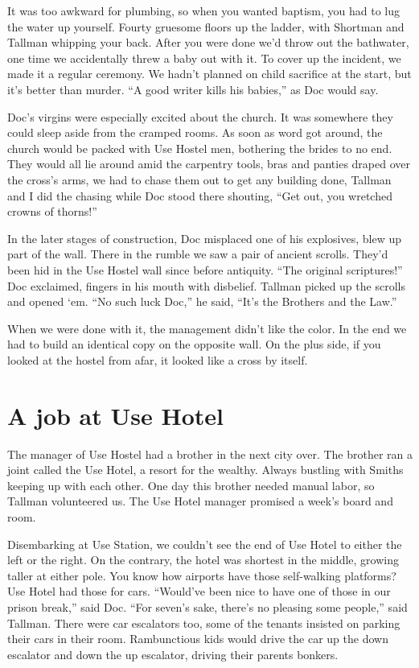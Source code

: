 \documentclass[oneside]{book}
\begin{document}
It was too awkward for plumbing, so when you wanted baptism, you had to lug the water up yourself.
Fourty gruesome floors up the ladder, with Shortman and Tallman whipping your back.  After you were done we'd throw
out the bathwater, one time we accidentally threw a baby out with it.  To cover up the incident,
we made it a regular ceremony.  We hadn't planned on child sacrifice at the start, but it's better
than murder.  ``A good writer kills his babies,'' as Doc would say.

Doc's virgins were especially excited about the church.  It was somewhere they could sleep aside from
the cramped rooms.  As soon as word got around, the church would be packed with Use Hostel men,
bothering the brides to no end.  They would all lie around amid the carpentry tools, bras and panties draped
over the cross's arms, we had to chase them out to get any building done, Tallman and I did the chasing while
Doc stood there shouting, ``Get out, you wretched crowns of thorns!''

In the later stages of construction, Doc misplaced one of his explosives, blew up part of the wall.
There in the rumble we saw a pair of ancient scrolls.  They'd been hid in the Use Hostel wall
since before antiquity.  ``The original scriptures!'' Doc exclaimed, fingers in
his mouth with disbelief.  Tallman picked up the scrolls and opened `em.  ``No such luck Doc,'' he
said, ``It's the Brothers and the Law.''

When we were done with it, the management didn't like the color.  In the end we had to build an identical
copy on the opposite wall.  On the plus side, if you looked at the hostel from afar, it looked
like a cross by itself.

\chapter{A job at Use Hotel}

The manager of Use Hostel had a brother in the next city over.  The brother ran a joint called the Use Hotel,
a resort for the wealthy.  Always bustling with Smiths keeping up with each other.
One day this brother needed manual labor, so
Tallman volunteered us.  The Use Hotel manager promised a week's board and room.

Disembarking at Use Station, we couldn't see the end of Use Hotel to either the left or the right.
On the contrary, the hotel was shortest in the middle, growing taller at either pole.
You know how airports have those self-walking platforms?  Use Hotel had those for cars.
``Would've been nice to have one of those in our prison break,'' said Doc.
``For seven's sake, there's no pleasing some people,'' said Tallman.
There were car escalators too, some of the tenants insisted on parking their cars
in their room.  Rambunctious kids would drive the car up the down escalator and down the
up escalator, driving their parents bonkers.
\end{document}
